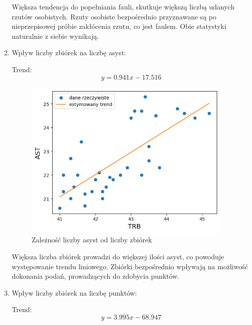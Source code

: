 \documentclass{article}
\begin{document}
\begin{enumerate}
        Większa tendencja do popełniania fauli, skutkuje większą liczbą udanych rzutów osobistych. Rzuty osobiste bezpośrednio przyznawane są po nieprzepisowej próbie zakłócenia rzutu, co jest faulem. Obie statystyki naturalnie z siebie wynikają.  
\newpage 
        \item Wpływ liczby zbiórek na liczbę asyst:
        
        
        Trend:\begin{equation} y = 0.941x - 17.516 \end{equation}
        
            \begin{figure}[H]
                \centering
                \includegraphics[width=10cm]{wykres_zaleznosci_AST_od_TRB.png}
                \caption{Zależność liczby asyst od liczby zbiórek}
                \label{fig:wykres_zaleznosci_AST_od_TRB}
            \end{figure}

        Większa liczba zbiórek prowadzi do większej ilości asyst, co powoduje występowanie trendu liniowego. Zbiórki bezpośrednio wpływają na możliwość dokonania podań, prowadzących do zdobycia punktów.
\newpage         
       \item Wpływ liczby zbiórek na liczbę punktów:
        
        
        Trend:\begin{equation} y = 3.995x - 68.947 \end{equation}
        

\end{enumerate}
\end{document}
